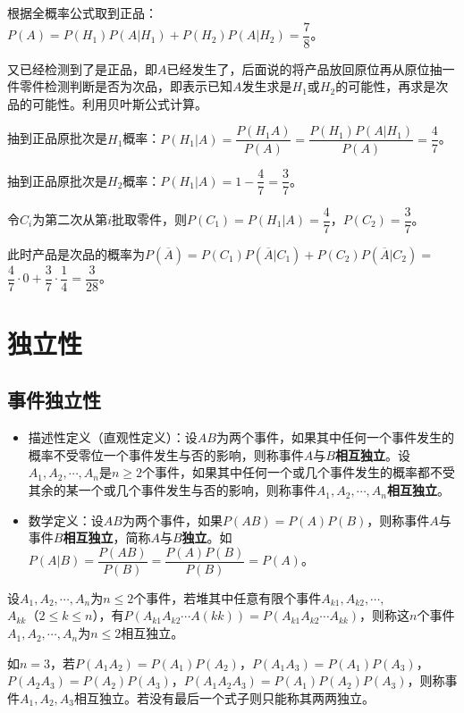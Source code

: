 \documentclass[UTF8, 12pt]{ctexart}
\begin{document}
根据全概率公式取到正品：$P(A)=P(H_1)P(A|H_1)+P(H_2)P(A|H_2)=\dfrac{7}{8}$。

又已经检测到了是正品，即$A$已经发生了，后面说的将产品放回原位再从原位抽一件零件检测判断是否为次品，即表示已知$A$发生求是$H_1$或$H_2$的可能性，再求是次品的可能性。利用贝叶斯公式计算。

抽到正品原批次是$H_1$概率：$P(H_1|A)=\dfrac{P(H_1A)}{P(A)}=\dfrac{P(H_1)P(A|H_1)}{P(A)}=\dfrac{4}{7}$。

抽到正品原批次是$H_2$概率：$P(H_1|A)=1-\dfrac{4}{7}=\dfrac{3}{7}$。

令$C_i$为第二次从第$i$批取零件，则$P(C_1)=P(H_1|A)=\dfrac{4}{7}$，$P(C_2)=\dfrac{3}{7}$。

此时产品是次品的概率为$P(\overline{A})=P(C_1)P(\overline{A}|C_1)+P(C_2)P(\overline{A}|C_2)=$\\$\dfrac{4}{7}\cdot0+\dfrac{3}{7}\cdot\dfrac{1}{4}=\dfrac{3}{28}$。

\section{独立性}

\subsection{事件独立性}

\begin{itemize}
    \item 描述性定义（直观性定义）：设$AB$为两个事件，如果其中任何一个事件发生的概率不受零位一个事件发生与否的影响，则称事件$A$与$B$\textbf{相互独立}。设$A_1,A_2,\cdots,A_n$是$n\geqslant2$个事件，如果其中任何一个或几个事件发生的概率都不受其余的某一个或几个事件发生与否的影响，则称事件$A_1,A_2,\cdots,A_n$\textbf{相互独立}。
    \item 数学定义：设$AB$为两个事件，如果$P(AB)=P(A)P(B)$，则称事件$A$与事件$B$\textbf{相互独立}，简称$A$与$B$\textbf{独立}。如$P(A|B)=\dfrac{P(AB)}{P(B)}=\dfrac{P(A)P(B)}{P(B)}=P(A)$。
\end{itemize}

设$A_1,A_2,\cdots,A_n$为$n\leqslant2$个事件，若堆其中任意有限个事件$A_{k1},A_{k2},\cdots,$\\$A_{kk}$（$2\leqslant k\leqslant n$），有$P(A_{k1}A_{k2}\cdots A(kk))=P(A_{k1}A_{k2}\cdots A_{kk})$，则称这$n$个事件$A_1,A_2,\cdots,A_n$为$n\leqslant2$相互独立。

如$n=3$，若$P(A_1A_2)=P(A_1)P(A_2)$，$P(A_1A_3)=P(A_1)P(A_3)$，$P(A_2A_3)=P(A_2)P(A_3)$，$P(A_1A_2A_3)=P(A_1)P(A_2)P(A_3)$，则称事件$A_1,A_2,A_3$相互独立。若没有最后一个式子则只能称其两两独立。
\end{document}

